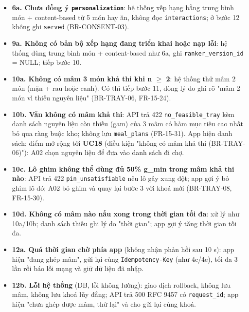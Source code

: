 \begin{itemize}
\item \textbf{6a. Chưa đồng ý {\small\texttt{personalization}}}: hệ thống xếp hạng bằng trung bình món + content-\allowbreak{}based từ 5 món hay ăn, không đọc {\small\texttt{interactions}}; ở bước 12 không ghi {\small\texttt{served}} (BR-\allowbreak{}CONSENT-\allowbreak{}03).
\item \textbf{9a. Không có bản bộ xếp hạng đang triển khai hoặc nạp lỗi}: hệ thống dùng trung bình món + content-\allowbreak{}based như 6a, ghi {\small\texttt{ranker\_\allowbreak{}\allowbreak{}version\_\allowbreak{}\allowbreak{}id}} = NULL; tiếp bước 10.
\item \textbf{10a. Không có mâm 3 món khả thi khi n \ensuremath{\geq} 2}: hệ thống thử mâm 2 món (mặn + rau hoặc canh). Có thì tiếp bước 11, dòng lý do ghi rõ "mâm 2 món vì thiếu nguyên liệu" (BR-\allowbreak{}TRAY-\allowbreak{}06, FR-\allowbreak{}15-\allowbreak{}24).
\item \textbf{10b. Vẫn không có mâm khả thi}: API trả 422 {\small\texttt{no\_\allowbreak{}\allowbreak{}feasible\_\allowbreak{}\allowbreak{}tray}} kèm danh sách nguyên liệu còn thiếu (gam) của 3 mâm có hàm mục tiêu cao nhất bỏ qua ràng buộc kho; không lưu {\small\texttt{meal\_\allowbreak{}\allowbreak{}plans}} (FR-\allowbreak{}15-\allowbreak{}31). App hiện danh sách; điểm mở rộng tới \textbf{UC18} (điều kiện "không có mâm khả thi (BR-\allowbreak{}TRAY-\allowbreak{}06)"): A02 chọn nguyên liệu để đưa vào danh sách đi chợ.
\item \textbf{10c. Lô ghim không thể dùng đủ 50\% g\_\allowbreak{}min trong mâm khả thi nào}: API trả 422 {\small\texttt{pin\_\allowbreak{}\allowbreak{}unsatisfiable}} nêu lô gây xung đột; app gợi ý bỏ ghim lô đó; A02 bỏ ghim và quay lại bước 3 với khoá mới (BR-\allowbreak{}TRAY-\allowbreak{}08, FR-\allowbreak{}15-\allowbreak{}30).
\item \textbf{10d. Không có mâm nào nấu xong trong thời gian tối đa}: xử lý như 10a/\allowbreak{}10b; danh sách thiếu ghi lý do "thời gian"; app gợi ý tăng thời gian tối đa.
\item \textbf{12a. Quá thời gian chờ phía app} (không nhận phản hồi sau 10 s): app hiện "đang ghép mâm", gửi lại cùng {\small\texttt{Idempotency-\allowbreak{}Key}} (như 4c/\allowbreak{}4e), tối đa 3 lần rồi báo lỗi mạng và giữ dữ liệu đã nhập.
\item \textbf{12b. Lỗi hệ thống} (DB, lỗi không lường): giao dịch rollback, không lưu mâm, không lưu khoá lũy đẳng; API trả 500 RFC 9457 có {\small\texttt{request\_\allowbreak{}\allowbreak{}id}}; app hiện "chưa ghép được mâm, thử lại" và cho gửi lại cùng khoá.

\end{itemize}
